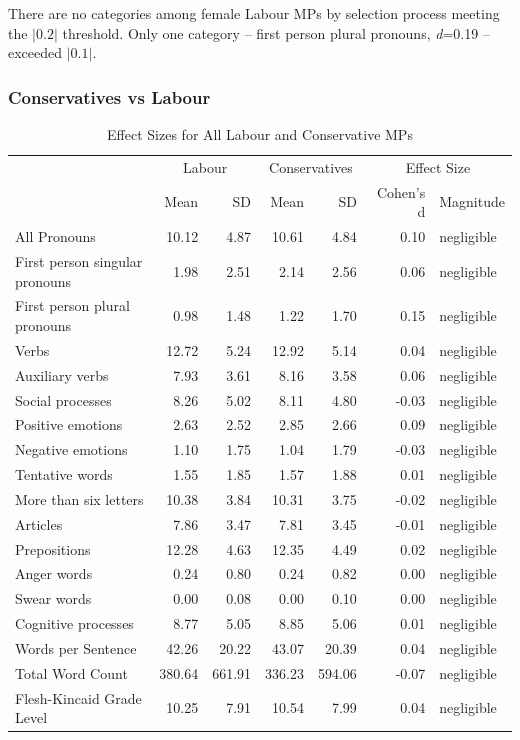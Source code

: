 \documentclass[]{article}
\begin{document}
There are no categories among female Labour MPs by selection process
meeting the \(|0.2|\) threshold. Only one category -- first person
plural pronouns, \emph{d}=0.19 -- exceeded \(|0.1|\).

\hypertarget{conservatives-vs-labour}{%
\subsubsection{Conservatives vs Labour}\label{conservatives-vs-labour}}

\begin{table}

\caption{\label{tab:tory-labour-effect-sizes-table}Effect Sizes for All Labour and Conservative MPs}
\centering
\begin{tabular}[t]{lrrrrrl}
\toprule
\multicolumn{1}{c}{ } & \multicolumn{2}{c}{Labour} & \multicolumn{2}{c}{Conservatives} & \multicolumn{2}{c}{Effect Size} \\
\cmidrule(l{2pt}r{2pt}){2-3} \cmidrule(l{2pt}r{2pt}){4-5} \cmidrule(l{2pt}r{2pt}){6-7}
 & Mean & SD & Mean & SD & Cohen's d & Magnitude\\
\midrule
All Pronouns & 10.12 & 4.87 & 10.61 & 4.84 & 0.10 & negligible\\
First person singular pronouns & 1.98 & 2.51 & 2.14 & 2.56 & 0.06 & negligible\\
First person plural pronouns & 0.98 & 1.48 & 1.22 & 1.70 & 0.15 & negligible\\
Verbs & 12.72 & 5.24 & 12.92 & 5.14 & 0.04 & negligible\\
Auxiliary verbs & 7.93 & 3.61 & 8.16 & 3.58 & 0.06 & negligible\\
\addlinespace
Social processes & 8.26 & 5.02 & 8.11 & 4.80 & -0.03 & negligible\\
Positive emotions & 2.63 & 2.52 & 2.85 & 2.66 & 0.09 & negligible\\
Negative emotions & 1.10 & 1.75 & 1.04 & 1.79 & -0.03 & negligible\\
Tentative words & 1.55 & 1.85 & 1.57 & 1.88 & 0.01 & negligible\\
More than six letters & 10.38 & 3.84 & 10.31 & 3.75 & -0.02 & negligible\\
\addlinespace
Articles & 7.86 & 3.47 & 7.81 & 3.45 & -0.01 & negligible\\
Prepositions & 12.28 & 4.63 & 12.35 & 4.49 & 0.02 & negligible\\
Anger words & 0.24 & 0.80 & 0.24 & 0.82 & 0.00 & negligible\\
Swear words & 0.00 & 0.08 & 0.00 & 0.10 & 0.00 & negligible\\
Cognitive processes & 8.77 & 5.05 & 8.85 & 5.06 & 0.01 & negligible\\
\addlinespace
Words per Sentence & 42.26 & 20.22 & 43.07 & 20.39 & 0.04 & negligible\\
Total Word Count & 380.64 & 661.91 & 336.23 & 594.06 & -0.07 & negligible\\
Flesh-Kincaid Grade Level & 10.25 & 7.91 & 10.54 & 7.99 & 0.04 & negligible\\
\bottomrule
\end{tabular}
\end{table}
\end{document}
